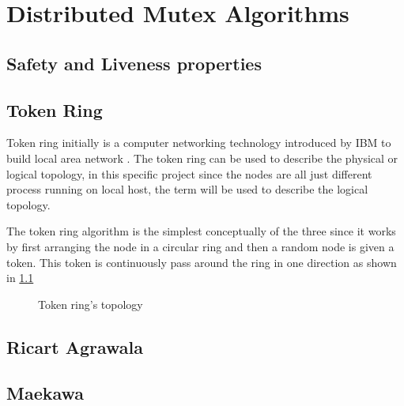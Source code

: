 \chapter{\centering Distributed Mutex Algorithms}

\section{Safety and Liveness properties}

\section{Token Ring}
Token ring initially is a computer networking technology introduced by IBM 
to build local area network \cite{wiki_token_ring}. The token ring can be used 
to describe the physical or logical topology, in this specific project since 
the nodes are all just different process running on local host, the term will be
used to describe the logical topology.

The token ring algorithm is the simplest conceptually of the three since it works 
by first arranging the node in a circular ring and then a random node is given a 
token. This token is continuously pass around the ring in one direction as shown in
\ref{fig:token_ring_top}


\begin{figure}[htbp]
  \centering
  
  \caption{Token ring's topology}
  \label{fig:token_ring_top}
\end{figure}

\section{Ricart Agrawala}

\section{Maekawa}

